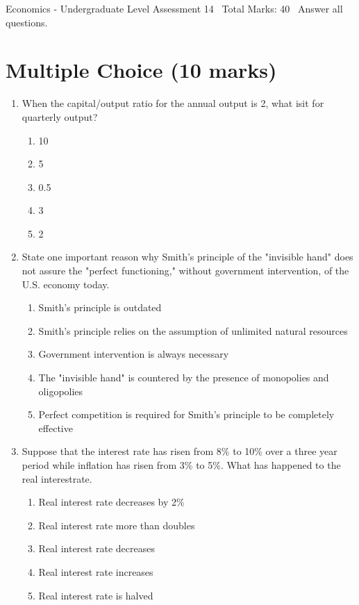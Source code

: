 \documentclass[12pt]{article}
\begin{document}
\begin{center}
Economics - Undergraduate Level Assessment 14 \
Total Marks: 40 \
Answer all questions.
\end{center}

\section*{Multiple Choice (10 marks)}
\begin{enumerate}[label=\arabic*.]
\item When the capital/output ratio for the annual output is 2, what isit for quarterly output?
\begin{enumerate}[label=(\alph*)]
    \item 10
    \item 5
    \item 0.5
    \item 3
    \item 2
\end{enumerate}
\item State one important reason why Smith's principle of the "invisible hand" does not assure the "perfect functioning," without government intervention, of the U.S. economy today.
\begin{enumerate}[label=(\alph*)]
    \item Smith's principle is outdated
    \item Smith's principle relies on the assumption of unlimited natural resources
    \item Government intervention is always necessary
    \item The "invisible hand" is countered by the presence of monopolies and oligopolies
    \item Perfect competition is required for Smith's principle to be completely effective
\end{enumerate}
\item Suppose that the interest rate has risen from 8\% to 10\% over a three year period while inflation has risen from 3\% to 5\%. What has happened to the real interestrate.
\begin{enumerate}[label=(\alph*)]
    \item Real interest rate decreases by 2\%
    \item Real interest rate more than doubles
    \item Real interest rate decreases
    \item Real interest rate increases
    \item Real interest rate is halved

\end{enumerate}
\end{enumerate}
\end{document}
